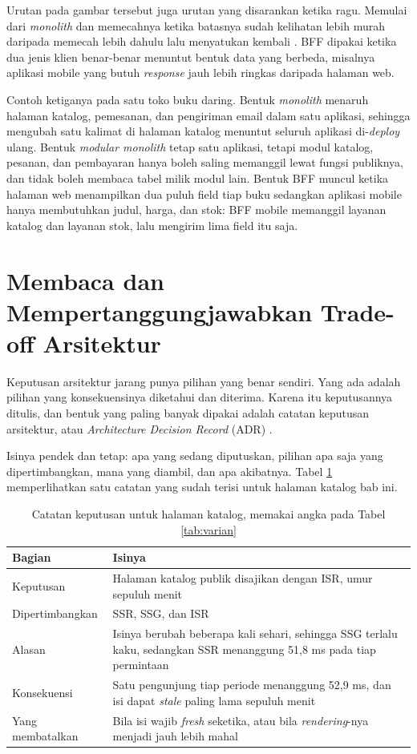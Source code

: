 Urutan pada gambar tersebut juga urutan yang disarankan ketika ragu.
Memulai dari \textit{monolith} dan memecahnya ketika batasnya sudah
kelihatan lebih murah daripada memecah lebih dahulu lalu menyatukan kembali
\cite{fowler-monolith-first}. BFF dipakai ketika dua jenis klien benar-benar
menuntut bentuk data yang berbeda, misalnya aplikasi mobile yang butuh
\textit{response} jauh lebih ringkas daripada halaman web.

Contoh ketiganya pada satu toko buku daring. Bentuk
\textit{monolith} menaruh halaman katalog, pemesanan, dan pengiriman email
dalam satu aplikasi, sehingga mengubah satu kalimat di halaman katalog
menuntut seluruh aplikasi di-\textit{deploy} ulang. Bentuk \textit{modular
monolith} tetap satu aplikasi, tetapi modul katalog, pesanan, dan pembayaran
hanya boleh saling memanggil lewat fungsi publiknya, dan tidak boleh membaca
tabel milik modul lain. Bentuk BFF muncul ketika halaman web menampilkan dua
puluh field tiap buku sedangkan aplikasi mobile hanya membutuhkan judul,
harga, dan stok: BFF mobile memanggil layanan katalog dan layanan stok, lalu
mengirim lima field itu saja.

\section{Membaca dan Mempertanggungjawabkan Trade-off Arsitektur}

Keputusan arsitektur jarang punya pilihan yang benar sendiri. Yang ada adalah
pilihan yang konsekuensinya diketahui dan diterima. Karena itu keputusannya
ditulis, dan bentuk yang paling banyak dipakai adalah catatan keputusan
arsitektur, atau \textit{Architecture Decision Record} (ADR)
\cite{nygard-adr}.

Isinya pendek dan tetap: apa yang sedang diputuskan, pilihan apa saja yang
dipertimbangkan, mana yang diambil, dan apa akibatnya. Tabel \ref{tab:adr}
memperlihatkan satu catatan yang sudah terisi untuk halaman katalog bab ini.

\begin{table}[!htb]
  \centering
  \caption{Catatan keputusan untuk halaman katalog, memakai angka pada Tabel
           \ref{tab:varian}}
  \label{tab:adr}
  \begin{tabularx}{\textwidth}{lX}
    \hline
    \textbf{Bagian} & \textbf{Isinya} \\
    \hline
    Keputusan & Halaman katalog publik disajikan dengan ISR, umur sepuluh menit \\
    \hline
    Dipertimbangkan & SSR, SSG, dan ISR \\
    \hline
    Alasan & Isinya berubah beberapa kali sehari, sehingga SSG terlalu kaku, sedangkan SSR menanggung 51,8 ms pada tiap permintaan \\
    \hline
    Konsekuensi & Satu pengunjung tiap periode menanggung 52,9 ms, dan isi dapat \textit{stale} paling lama sepuluh menit \\
    \hline
    Yang membatalkan & Bila isi wajib \textit{fresh} seketika, atau bila \textit{rendering}-nya menjadi jauh lebih mahal \\
    \hline
  \end{tabularx}
\end{table}

